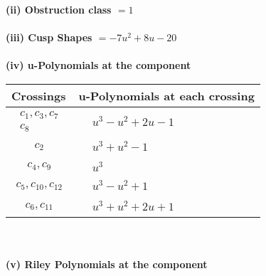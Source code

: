 \documentclass[1p]{elsarticle_modified}
\theoremstyle{definition}
\begin{document}
\flushleft \textbf{(ii) Obstruction class $= 1$}\\~\\
\flushleft \textbf{(iii) Cusp Shapes $= -7 u^2+8 u-20$}\\~\\
\newpage\renewcommand{\arraystretch}{1}
\flushleft \textbf{(iv) u-Polynomials at the component}\newline \\
\begin{tabular}{m{50pt}|m{274pt}}
Crossings & \hspace{64pt}u-Polynomials at each crossing \\
\hline $$\begin{aligned}c_{1},c_{3},c_{7}\\c_{8}\end{aligned}$$&$\begin{aligned}
&u^3- u^2+2 u-1
\end{aligned}$\\
\hline $$\begin{aligned}c_{2}\end{aligned}$$&$\begin{aligned}
&u^3+u^2-1
\end{aligned}$\\
\hline $$\begin{aligned}c_{4},c_{9}\end{aligned}$$&$\begin{aligned}
&u^3
\end{aligned}$\\
\hline $$\begin{aligned}c_{5},c_{10},c_{12}\end{aligned}$$&$\begin{aligned}
&u^3- u^2+1
\end{aligned}$\\
\hline $$\begin{aligned}c_{6},c_{11}\end{aligned}$$&$\begin{aligned}
&u^3+u^2+2 u+1
\end{aligned}$\\
\hline
\end{tabular}\\~\\
\newpage\renewcommand{\arraystretch}{1}
\flushleft \textbf{(v) Riley Polynomials at the component}\newline \\
\end{document}
